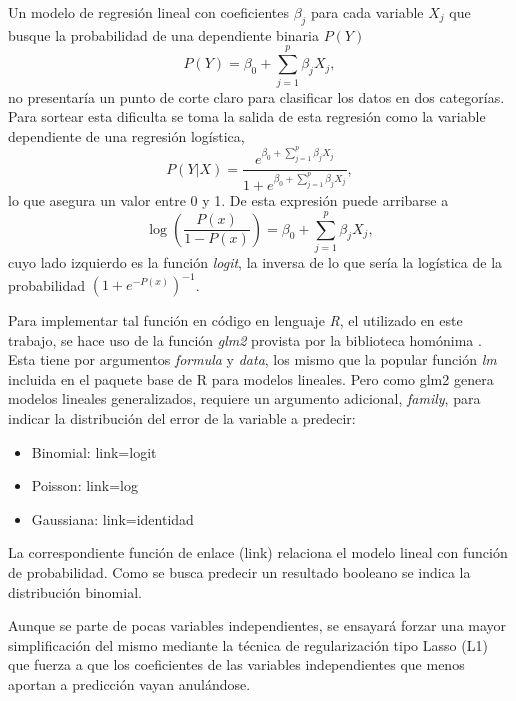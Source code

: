\documentclass[a4paper]{report}
\begin{document}
Un modelo de regresión lineal con coeficientes \(\beta_j\) para cada variable \(X_j\) que busque la probabilidad de una dependiente binaria \(P(Y)\)  
\begin{equation}
P(Y) = \beta_0 + \sum\limits_{j=1}^p \beta_j X_j,	
\end{equation}
no presentaría un punto de corte claro para clasificar los datos en dos categorías.
Para sortear esta dificulta se toma la salida de esta regresión como la variable dependiente de una regresión logística,
\begin{equation}
P(Y|X)= \frac{e^{\beta_0 + \sum\limits_{j=1}^p \beta_j X_j}}{1+e^{\beta_0 + \sum\limits_{j=1}^p \beta_j X_j}},
\end{equation}
lo que asegura un valor entre 0 y 1.
De esta expresión puede arribarse a 
\begin{equation}
	\log \left( \frac{P(x)}{1-P(x)} \right) = \beta_0 + \sum\limits_{j=1}^p \beta_j X_j,
\end{equation}
cuyo lado izquierdo es la función \emph{logit}, la inversa de lo que sería la logística de la probabilidad \(\left(1 + e^{-{P(x)}}\right)^{-1}\).

Para implementar tal función en código en lenguaje \emph{R}, el utilizado en este trabajo, se hace uso de la función \emph{glm2} provista por la biblioteca homónima \cite{marschner_glm2_2011}.
Esta tiene por argumentos \emph{formula} y \emph{data}, los mismo que la popular función \emph{lm} incluida en el paquete base de R para modelos lineales.
Pero como glm2 genera modelos lineales generalizados, requiere un argumento adicional, \emph{family}, para indicar la distribución del error de la variable a predecir:
\begin{itemize}
	\item Binomial: link=logit
	\item Poisson: link=log
	\item Gaussiana: link=identidad
\end{itemize}
La correspondiente función de enlace (link) relaciona el modelo lineal con función de probabilidad.
Como se busca predecir un resultado booleano se indica la distribución binomial.

Aunque se parte de pocas variables independientes, se ensayará forzar una mayor simplificación del mismo mediante la técnica de regularización tipo Lasso (L1) que fuerza a que los coeficientes de las variables independientes que menos aportan a predicción vayan anulándose.
\end{document}
